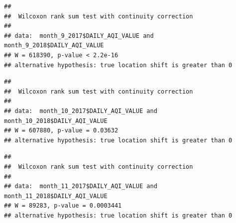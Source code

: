 \documentclass[12pt,]{article}
\newenvironment{Shaded}{\begin{snugshade}}{\end{snugshade}}
\newcommand{\KeywordTok}[1]{\textcolor[rgb]{0.13,0.29,0.53}{\textbf{#1}}}
\newcommand{\DataTypeTok}[1]{\textcolor[rgb]{0.13,0.29,0.53}{#1}}
\newcommand{\DecValTok}[1]{\textcolor[rgb]{0.00,0.00,0.81}{#1}}
\newcommand{\StringTok}[1]{\textcolor[rgb]{0.31,0.60,0.02}{#1}}
\newcommand{\OperatorTok}[1]{\textcolor[rgb]{0.81,0.36,0.00}{\textbf{#1}}}
\newcommand{\NormalTok}[1]{#1}
\begin{document}
\begin{Shaded}
\end{Shaded}

\begin{verbatim}
## 
##  Wilcoxon rank sum test with continuity correction
## 
## data:  month_9_2017$DAILY_AQI_VALUE and month_9_2018$DAILY_AQI_VALUE
## W = 618390, p-value < 2.2e-16
## alternative hypothesis: true location shift is greater than 0
\end{verbatim}

\begin{Shaded}
\end{Shaded}

\begin{verbatim}
## 
##  Wilcoxon rank sum test with continuity correction
## 
## data:  month_10_2017$DAILY_AQI_VALUE and month_10_2018$DAILY_AQI_VALUE
## W = 607880, p-value = 0.03632
## alternative hypothesis: true location shift is greater than 0
\end{verbatim}

\begin{Shaded}
\end{Shaded}

\begin{verbatim}
## 
##  Wilcoxon rank sum test with continuity correction
## 
## data:  month_11_2017$DAILY_AQI_VALUE and month_11_2018$DAILY_AQI_VALUE
## W = 89283, p-value = 0.0003441
## alternative hypothesis: true location shift is greater than 0
\end{verbatim}
\end{document}
